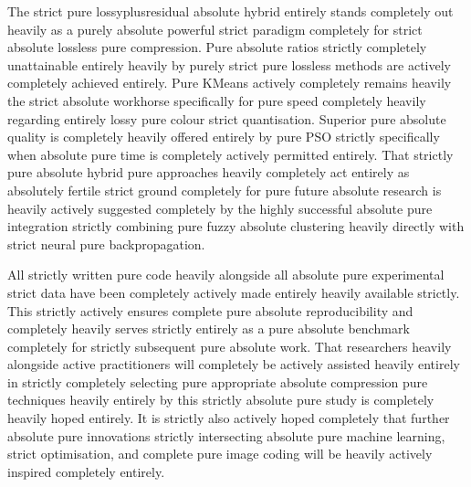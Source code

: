 The strict pure lossyplusresidual absolute hybrid entirely stands completely out heavily as a purely absolute powerful strict paradigm completely for strict absolute lossless pure compression. Pure absolute ratios strictly completely unattainable entirely heavily by purely strict pure lossless methods are actively completely achieved entirely. Pure KMeans actively completely remains heavily the strict absolute workhorse specifically for pure speed completely heavily regarding entirely lossy pure colour strict quantisation. Superior pure absolute quality is completely heavily offered entirely by pure PSO strictly specifically when absolute pure time is completely actively permitted entirely. That strictly pure absolute hybrid pure approaches heavily completely act entirely as absolutely fertile strict ground completely for pure future absolute research is heavily actively suggested completely by the highly successful absolute pure integration strictly combining pure fuzzy absolute clustering heavily directly with strict neural pure backpropagation.

All strictly written pure code heavily alongside all absolute pure experimental strict data have been completely actively made entirely heavily available strictly. This strictly actively ensures complete pure absolute reproducibility and completely heavily serves strictly entirely as a pure absolute benchmark completely for strictly subsequent pure absolute work. That researchers heavily alongside active practitioners will completely be actively assisted heavily entirely in strictly completely selecting pure appropriate absolute compression pure techniques heavily entirely by this strictly absolute pure study is completely heavily hoped entirely. It is strictly also actively hoped completely that further absolute pure innovations strictly intersecting absolute pure machine learning, strict optimisation, and complete pure image coding will be heavily actively inspired completely entirely.